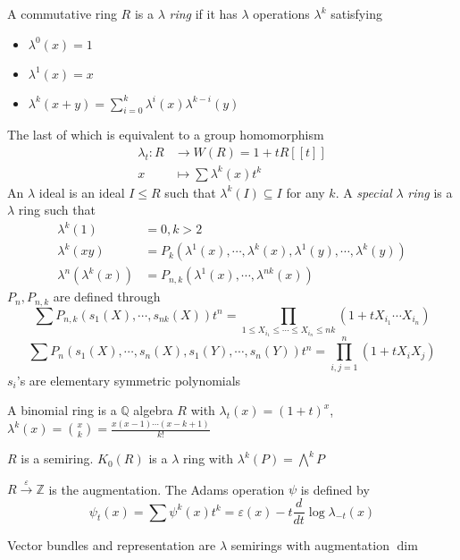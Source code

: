 \documentclass[main]{subfiles}
\begin{document}
\begin{definition}
A commutative ring $R$ is a $\lambda$ \textit{ring} if it has $\lambda$ operations $\lambda^k$ satisfying
\begin{itemize}
\item $\lambda^0(x)=1$
\item $\lambda^1(x)=x$
\item $\lambda^k(x+y)=\sum_{i=0}^k\lambda^i(x)\lambda^{k-i}(y)$
\end{itemize}
The last of which is equivalent to a group homomorphism
\begin{align*}
\lambda_t:R&\to W(R)=1+tR[[t]] \\
x&\mapsto\sum \lambda^k(x)t^k
\end{align*}An $\lambda$ ideal is an ideal $I\leq R$ such that $\lambda^k(I)\subseteq I$ for any $k$. A \textit{special} $\lambda$ \textit{ring} is a $\lambda$ ring such that
\begin{align*}
\lambda^k(1)&=0, k>2 \\
\lambda^k(xy)&=P_k(\lambda^1(x),\cdots,\lambda^k(x),\lambda^1(y),\cdots,\lambda^k(y)) \\
\lambda^n(\lambda^k(x))&=P_{n,k}(\lambda^1(x),\cdots,\lambda^{nk}(x))
\end{align*}
$P_n,P_{n,k}$ are defined through
\[
\sum P_{n,k}(s_1(X),\cdots,s_{nk}(X))t^n=\prod_{1\leq X_{i_1}\leq\cdots\leq X_{i_n}\leq nk}(1+tX_{i_1}\cdots X_{i_n})
\]
\[
\sum P_{n}(s_1(X),\cdots,s_n(X),s_1(Y),\cdots,s_n(Y))t^n=\prod_{i,j=1}^n(1+tX_iX_j)
\]
$s_i$'s are elementary symmetric polynomials
\end{definition}

\begin{example}
A binomial ring is a $\mathbb Q$ algebra $R$ with $\lambda_t(x)=(1+t)^x$, $\lambda^k(x)=\binom{x}{k}=\frac{x(x-1)\cdots(x-k+1)}{k!}$
\end{example}

\begin{example}
$R$ is a semiring. $K_0(R)$ is a $\lambda$ ring with $\lambda^k(P)=\bigwedge^kP$
\end{example}

\begin{definition}
$R\xrightarrow\varepsilon\mathbb Z$ is the augmentation. The Adams operation $\psi$ is defined by
\[\psi_t(x)=\sum\psi^k(x)t^k=\varepsilon(x)-t\frac{d}{dt}\log\lambda_{-t}(x)\]
\end{definition}

\begin{example}
Vector bundles and representation are $\lambda$ semirings with augmentation $\dim$
\end{example}
\end{document}
